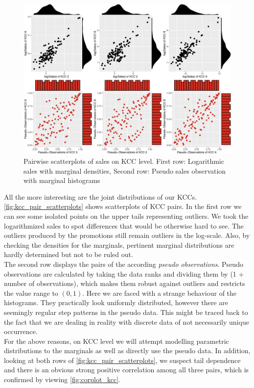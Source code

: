 \begin{figure}[H]
\centering
  \includegraphics[width=0.95\linewidth]{figures/kcc_pair_scatterplots.eps}
  \caption{Pairwise scatterplots of sales on \ac{KCC} level. First row: Logarithmic sales with marginal densities, Second row: Pseudo sales observation with marginal histograms}
  \label{fig:kcc_pair_scatterplots}
\end{figure}


All the more interesting are the joint distributions of our \acp{KCC}. \autoref{fig:kcc_pair_scatterplots} shows scatterplots of \ac{KCC} pairs. In the first row we can see some isolated points on the upper tails representing outliers. We took the logarithmized sales to spot differences that would be otherwise hard to see. The outliers produced by the promotions still remain outliers in the log-scale. Also, by checking the densities for the marginals, pertinent marginal distributions are hardly determined but not to be ruled out.\\
The second row displays the pairs of the according \textit{pseudo observations}. Pseudo observations are calculated by taking the data ranks and dividing them by (1 + number of observations), which makes them robust against outliers and restricts the value range to $(0, 1)$. Here we are faced with a strange behaviour of the histograms. They practically look uniformly distributed, however there are seemingly regular step patterns in the pseudo data. This might be traced back to the fact that we are dealing in reality with discrete data of not necessarily unique occurrence.\\

For the above reasons, on \ac{KCC} level we will attempt modelling parametric distributions to the marginals as well as directly use the pseudo data. 
In addition, looking at both rows of \autoref{fig:kcc_pair_scatterplots}, we suspect tail dependence and there is an obvious strong positive correlation among all three pairs, which is confirmed by viewing \autoref{fig:corplot_kcc}. \\


